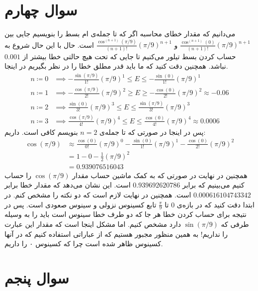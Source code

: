 \documentclass[]{article}
\begin{document}
\section*{سوال چهارم}
می‌دانیم که مقدار خطای محاسبه اگر که تا جمله‌ی
ام
بسط را بنویسیم جایی بین
$\frac{\cos^{(n+1)}(0)}{(n+1)!}(\pi / 9)^{n+1}$ و $\frac{\cos^{(n+1)}(\pi / 9)}{(n+1)!}(\pi / 9)^{n+1}$
است. حال با این حال شروع به حساب کردن بسط تیلور می‌کنیم تا جایی که تحت هیچ حالتی خطا بیشتر از
$0.001$
نباشد. همچنین دقت کنید که ما باید قدر مطلق خطا را در نظر بگیریم در اینجا.
\begin{align*}
    n \coloneqq 0 &\implies -\frac{\sin(\pi / 9)}{1!}(\pi / 9)^{1} \leq E \leq -\frac{\sin(0)}{1!}(\pi / 9)^{1}\\
    n \coloneqq 1 &\implies -\frac{\cos(\pi / 9)}{2!}(\pi / 9)^2 \geq E \geq -\frac{\cos(0)}{2!}(\pi / 9)^{2} \approx -0.06\\
    n \coloneqq 2 &\implies \frac{\sin(0)}{3!}(\pi / 9)^3 \leq E \leq \frac{\sin(\pi / 9)}{3!}(\pi / 9)^{3}\\
    n \coloneqq 3 &\implies \frac{\cos(\pi / 9)}{4!}(\pi / 9)^{4} \leq E \leq \frac{\cos(0)}{4!}(\pi / 9)^4 \approx 0.0006
\end{align*}
پس در اینجا در صورتی که تا جمله‌ی
$n=2$
بنویسم کافی است. داریم:
\begin{align*}
    \cos(\pi/9) &\approx \frac{\cos(0)}{0!}(\pi / 9)^{0} - \frac{\sin(0)}{1!}(\pi / 9)^{1} - \frac{\cos(0)}{2!}(\pi / 9)^{2}\\
    &= 1 - 0 - \frac{1}{2}(\pi / 9)^{2}\\
    &= \boxed{0.939076516043}
\end{align*}
همچنین در نهایت در صورتی که به کمک ماشین حساب مقدار
$\cos(\pi/9)$
را حساب کنیم می‌بینیم که برابر
$0.939692620786$
است. این نشان می‌دهد که مقدار خطا برابر
$0.000616104743342$
است. همچنین در نهایت لازم است که دو نکته را مشخص کنم. در ابتدا دقت کنید که در بازه‌ی
$0$ تا $\frac{\pi}{9}$
تابع کسینوس نزولی و سینوس صعودی است. پس در نتیجه برای حساب کردن
خطا هر جا که دو طرف خطا سینوس است باید
را به وسیله طرفی که
$\sin(\pi / 9)$
دارد مشخص کنیم. اما مشکل اینجا است که مقدار این عبارت را نداریم! به همین منظور مجبور هستیم که
از عباراتی استفاده کنیم که در آنها کسینوس ظاهر شده است چرا که کسینوس ۰ را داریم.
\section*{سوال پنجم}
\end{document}
